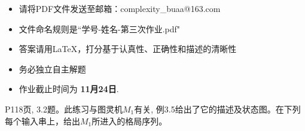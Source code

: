 \documentclass[11pt,addpoints,answers]{exam}
\newcommand{\duedate}{11月24日} %
\begin{document}
	
 
	
	\pagestyle{head}                %
\begin{itemize}
	\item 请将PDF文件发送至邮箱：complexity\_buaa@163.com
	\item 文件命名规则是``学号-姓名-第三次作业.pdf"
	\item 答案请用\LaTeX，打分基于认真性、正确性和描述的清晰性
	\item 务必独立自主解题
	\item 作业截止时间为 \textbf{\duedate}.
\end{itemize}


	\begin{questions}
		
		
		\question P118页, 3.2题。此练习与图灵机$M_1$有关, 例3.5给出了它的描述及状态图。在下列每个输入串上，给出$M_1$所进入的格局序列。
		
\end{questions}
\end{document}
